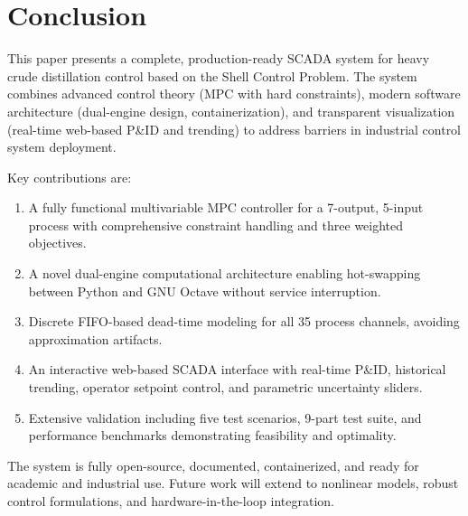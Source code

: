 \documentclass[conference]{IEEEtran}
\begin{document}
\section{Conclusion}

This paper presents a complete, production-ready SCADA system for heavy crude distillation control based on the Shell Control Problem. The system combines advanced control theory (MPC with hard constraints), modern software architecture (dual-engine design, containerization), and transparent visualization (real-time web-based P\&ID and trending) to address barriers in industrial control system deployment.

Key contributions are:
\begin{enumerate}
\item A fully functional multivariable MPC controller for a 7-output, 5-input process with comprehensive constraint handling and three weighted objectives.
\item A novel dual-engine computational architecture enabling hot-swapping between Python and GNU Octave without service interruption.
\item Discrete FIFO-based dead-time modeling for all 35 process channels, avoiding approximation artifacts.
\item An interactive web-based SCADA interface with real-time P\&ID, historical trending, operator setpoint control, and parametric uncertainty sliders.
\item Extensive validation including five test scenarios, 9-part test suite, and performance benchmarks demonstrating feasibility and optimality.
\end{enumerate}

The system is fully open-source, documented, containerized, and ready for academic and industrial use. Future work will extend to nonlinear models, robust control formulations, and hardware-in-the-loop integration.
\end{document}
